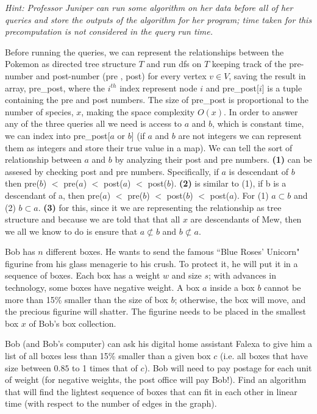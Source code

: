 \documentclass[11pt]{article}
\begin{document}
\begin{subparts}
    \emph{Hint: Professor Juniper can run some algorithm on her data before all of her queries and store the outputs of the algorithm for her program; time taken for this precomputation is not considered in the query run time.}\\
    \begin{solution}
        Before running the queries, we can represent the relationships between the Pokemon as directed tree structure $T$ and run dfs on $T$ 
        keeping track of the pre-number and post-number (pre , post) for every vertex $v \in V$, saving the result in array, pre\_post, where the $i^{th}$ index represent node $i$ and pre\_post[$i$]
        is a tuple containing the pre and post numbers. The size of pre\_post is proportional to the number of species, $x$, making the space complexity $O(x)$. In order to answer any of the three queries all we need is 
        access to $a$ and $b$, which is constant time, we can index into pre\_post[$a$ or $b$] (if $a$ and $b$ are not integers we can represent them as integers and store their true value in a map). We can tell the sort of relationship between $a$ and $b$ by 
        analyzing their post and pre numbers. \textbf{(1)} can be assesed by checking post and pre numbers. Specifically, if $a$ is descendant of $b$ then pre($b$) $<$ pre($a$) $<$ post($a$) $<$ post($b$). \textbf{(2)} is similar to (1), if b is a descendant of a, then pre($a$) $<$ pre($b$) $<$ post($b$) $<$ post($a$).
        For (1) $a \subset b$ and (2) $b \subset a$. \textbf{(3)} for this, since it we are representing the relationship as tree structure and because we are told that 
        that all $x$ are descendants of Mew, then we all we know to do is ensure that $a \not\subset b$ and $b \not\subset a$.
    \end{solution}
    
    \subpart Bob has $n$ different boxes. He wants to send the famous ``Blue Roses' Unicorn" figurine from his glass menagerie to his crush. To protect it, he will put it in a sequence of boxes. Each box has a weight $w$ and size $s$; with advances in technology, some boxes have negative weight. A box $a$ inside a box $b$ cannot be more than 15\% smaller than the size of box $b$; otherwise, the box will move, and the precious figurine will shatter. The figurine needs to be placed in the smallest box $x$ of Bob's box collection.
    
\noindent Bob (and Bob's computer) can ask his digital home assistant Falexa to give him a list of all boxes less than 15\% smaller than a given box $c$ (i.e. all boxes that have size between $0.85$ to 1 times that of $c$). Bob will need to pay postage for each unit of weight (for negative weights, the post office will pay Bob!). Find an algorithm that will find the lightest sequence of boxes that can fit in each other in linear time (with respect to the number of edges in the graph). 


\end{subparts}
\end{document}

